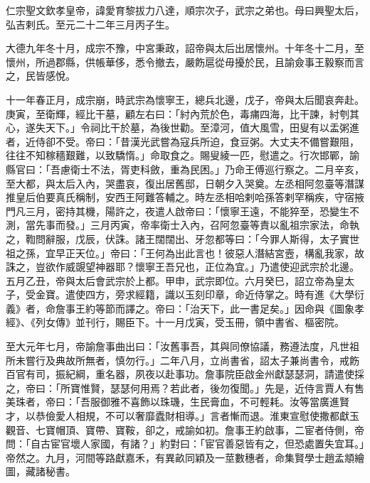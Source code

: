 
\begin{pinyinscope}

 仁宗聖文欽孝皇帝，諱愛育黎拔力八達，順宗次子，武宗之弟也。母曰興聖太后，弘吉剌氏。至元二十二年三月丙子生。



 大德九年冬十月，成宗不豫，中宮秉政，詔帝與太后出居懷州。十年冬十二月，至懷州，所過郡縣，供帳華侈，悉令撤去，嚴飭扈從毋擾於民，且諭僉事王毅察而言之，民皆感悅。



 十一年春正月，成宗崩，時武宗為懷寧王，總兵北邊，戊子，帝與太后聞哀奔赴。庚寅，至衛輝，經比干墓，顧左右曰：「紂內荒於色，毒痡四海，比干諫，紂刳其心，遂失天下。」令祠比干於墓，為後世勸。至漳河，值大風雪，田叟有以盂粥進者，近侍卻不受。帝曰：「昔漢光武嘗為寇兵所迫，食豆粥。大丈夫不備嘗艱阻，往往不知稼穡艱難，以致驕惰。」命取食之。賜叟綾一匹，慰遣之。行次邯鄲，諭縣官曰：「吾慮衛士不法，胥吏科斂，重為民困。」乃命王傅巡行察之。二月辛亥，至大都，與太后入內，哭盡哀，復出居舊邸，日朝夕入哭奠。左丞相阿忽臺等潛謀推皇后伯要真氏稱制，安西王阿難答輔之。時左丞相哈剌哈孫答剌罕稱疾，守宿掖門凡三月，密持其機，陽許之，夜遣人啟帝曰：「懷寧王遠，不能猝至，恐變生不測，當先事而發。」三月丙寅，帝率衛士入內，召阿忽臺等責以亂祖宗家法，命執之，鞫問辭服，戊辰，伏誅。諸王闊闊出、牙忽都等曰：「今罪人斯得，太子實世祖之孫，宜早正天位。」帝曰：「王何為出此言也！彼惡人潛結宮壼，構亂我家，故誅之，豈欲作威覬望神器耶？懷寧王吾兄也，正位為宜。」乃遣使迎武宗於北邊。五月乙丑，帝與太后會武宗於上都。甲申，武宗即位。六月癸巳，詔立帝為皇太子，受金寶。遣使四方，旁求經籍，識以玉刻印章，命近侍掌之。時有進《大學衍義》者，命詹事王約等節而譯之。帝曰：「治天下，此一書足矣。」因命與《圖象孝經》、《列女傳》並刊行，賜臣下。十一月戊寅，受玉冊，領中書省、樞密院。



 至大元年七月，帝諭詹事曲出曰：「汝舊事吾，其與同僚協議，務遵法度，凡世祖所未嘗行及典故所無者，慎勿行。」二年八月，立尚書省，詔太子兼尚書令，戒飭百官有司，振紀綱，重名器，夙夜以赴事功。詹事院臣啟金州獻瑟瑟洞，請遣使採之，帝曰：「所寶惟賢，瑟瑟何用焉？若此者，後勿復聞。」先是，近侍言賈人有售美珠者，帝曰：「吾服御雅不喜飾以珠璣，生民膏血，不可輕耗。汝等當廣進賢才，以恭儉愛人相規，不可以奢靡蠹財相導。」言者慚而退。淮東宣慰使撒都獻玉觀音、七寶帽頂、寶帶、寶鞍，卻之，戒諭如初。詹事王約啟事，二宦者侍側，帝問：「自古宦官壞人家國，有諸？」約對曰：「宦官善惡皆有之，但恐處置失宜耳。」帝然之。九月，河間等路獻嘉禾，有異畝同穎及一莖數穗者，命集賢學士趙孟頫繪圖，藏諸秘書。




\end{pinyinscope}
